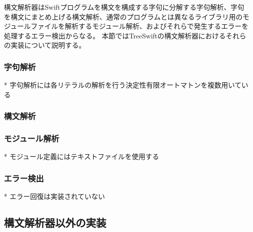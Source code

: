 構文解析器はSwiftプログラムを構文を構成する字句に分解する字句解析、字句を構文にまとめ上げる構文解析、通常のプログラムとは異なるライブラリ用のモジュールファイルを解析するモジュール解析、およびそれらで発生するエラーを処理するエラー検出からなる。
本節ではTreeSwiftの構文解析器におけるそれらの実装について説明する。

\subsubsection{字句解析}

* 字句解析には各リテラルの解析を行う決定性有限オートマトンを複数用いている

\subsubsection{構文解析}

\subsubsection{モジュール解析}

* モジュール定義にはテキストファイルを使用する

\subsubsection{エラー検出}

* エラー回復は実装されていない

\subsection{構文解析器以外の実装}





